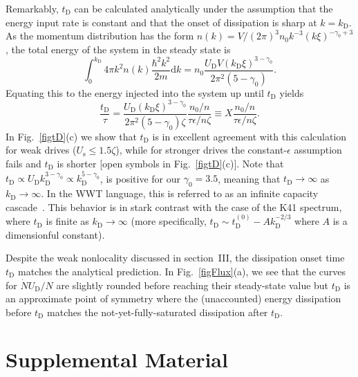 \documentclass[prl,aps,twocolumn, a4paper,longbibliography,superscriptaddress]{revtex4-2}
\newcommand{\kD}{k_{\textrm{D}}}
\newcommand{\UD}{U_{\textrm{D}}}
\newcommand{\tD}{t_{\textrm{D}}}
\newcommand{\Us}{U_{\textrm{s}}}
\begin{document}
Remarkably, $\tD$ can be calculated analytically under the assumption that the energy input rate is constant and that the onset of dissipation is sharp at $k=\kD$. As the momentum distribution has the form $n(k)=V/(2\pi)^3n_0 k^{-3} (k\xi)^{-\gamma_0+3}$, the total energy of the system in the steady state is
$$\int_0^{\kD} 4\pi k^2 n(k) \frac{\hbar^2k^2}{2m}\text{d}k=n_0\frac{\UD V (\kD\xi)^{3-\gamma_0}}{2\pi^2(5-\gamma_0)}.$$
Equating this to the energy injected into the system up until $\tD$ yields
\begin{equation}
\label{eq:tD}
\frac{\tD}{\tau}=\frac{\UD (\kD\xi)^{3-\gamma_0}}{2\pi^2 (5-\gamma_0)\zeta}\frac{n_0/n}{\tau\epsilon/n\zeta}\equiv X\frac{n_0/n}{\tau\epsilon/n\zeta}.
\end{equation}
In Fig.~\ref{figtD}(c) we show that $\tD$ is in excellent agreement with this calculation for weak drives ($\Us\leq 1.5\zeta$), while for stronger drives the constant-$\epsilon$ assumption fails and $\tD$ is shorter [open symbols in Fig.~\ref{figtD}(c)].
Note that $\tD\propto \UD \kD^{3-\gamma_0}\propto \kD^{5-\gamma_0}$, is positive for our $\gamma_0=3.5$, meaning that $\tD\rightarrow \infty$ as $\kD\rightarrow\infty$. In the WWT language, this is referred to as an infinite capacity cascade~\cite{Nazarenko:2011}. This behavior is in stark contrast with the case of the K41 spectrum, where $\tD$ is finite as $\kD\rightarrow\infty$ (more specifically, $\tD\sim\tD^{(0)}- A\kD^{-2/3}$ where $A$ is a dimensionful constant).

Despite the weak nonlocality discussed in section~III, the dissipation onset time $\tD$ matches the analytical prediction.
In Fig.~\ref{figFlux}(a), we see that the curves for $\dot{N}\UD/N$ are slightly rounded before reaching their steady-state value but $\tD$ is an approximate point of symmetry where the (unaccounted) energy dissipation before $\tD$ matches the not-yet-fully-saturated dissipation after $\tD$.



\newpage

\setcounter{figure}{0}
\setcounter{equation}{0}

\renewcommand\theequation{S\arabic{equation}}
\renewcommand\thefigure{S\arabic{figure}}
\onecolumngrid

\section{Supplemental Material}
\label{SI}
\end{document}
